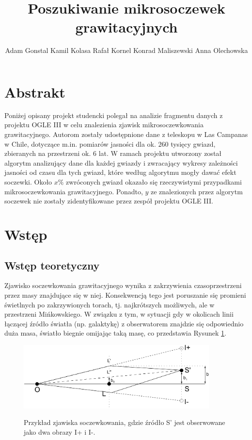 \documentclass[a4paper,11pt]{article}
\author{Adam Gonstal	Kamil Kolasa	Rafał Kornel	Konrad Maliszewski	Anna Olechowska}
\title{Poszukiwanie mikrosoczewek grawitacyjnych}
\newcommand{\ak}{\hspace{1.0cm}}
\begin{document}
\maketitle
\newpage
\tableofcontents
\newpage
\section{Abstrakt}
\ak Poniżej opisany projekt studencki polegał na analizie fragmentu danych z projektu OGLE III w celu znalezienia zjawisk mikrosoczewkowania grawitacyjnego.  Autorom zostały udostępnione dane z teleskopu w Las Campanas w Chile, dotyczące m.in. pomiarów jasności dla ok. $260$ tysięcy  gwiazd, zbieranych na przestrzeni ok. $6$ lat. W ramach projektu utworzony został algorytm analizujący dane dla każdej gwiazdy i zwracający wykresy zależności jasności od czasu dla tych gwiazd, które według algorytmu mogły dawać efekt soczewki. Około $x\%$ zwróconych gwiazd okazało się rzeczywistymi przypadkami mikrosoczewkowania grawitacyjnego. Ponadto, $y$ ze znalezionych przez algorytm soczewek nie zostały zidentyfikowane przez zespół projektu OGLE III.
\section{Wstęp}
\subsection{Wstęp teoretyczny}
\ak Zjawisko soczewkowania grawitacyjnego wynika z zakrzywienia czasoprzestrzeni przez masy znajdujące się w niej. Konsekwencją tego jest poruszanie się promieni świetlnych po zakrzywionych torach, tj. najkrótszych możliwych, ale w przestrzeni Mińkowskiego. W związku z tym, w sytuacji gdy w okolicach linii łączącej źródło światła (np. galaktykę) z obserwatorem znajdzie się odpowiednio duża masa, światło biegnie omijając taką masę, co przedstawia Rysunek \ref{Fig_1}. 

\begin{figure}[h]
\centering
\includegraphics[width=0.9\textwidth]{Fig/Lens.jpeg}
\label{Fig_1}
\caption{Przykład zjawiska soczewkowania, gdzie źródło S' jest obserwowane jako dwa obrazy I+ i I-\cite{Lens}.}
\end{figure}
\end{document}
